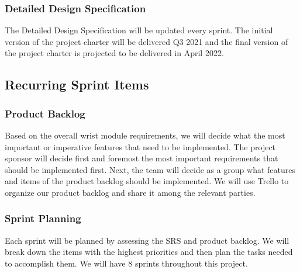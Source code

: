 \subsubsection{Detailed Design Specification}
The Detailed Design Specification will be updated every sprint. The initial version of the project charter will be delivered Q3 2021 and the final version of the project charter is projected to be delivered in April 2022.

\subsection{Recurring Sprint Items}

\subsubsection{Product Backlog}
Based on the overall wrist module requirements, we will decide what the most important or imperative features that need to be implemented. The project sponsor will decide first and foremost the most important requirements that should be implemented first. Next, the team will decide as a group what features and items of the product backlog should be implemented. We will use Trello to organize our product backlog and share it among the relevant parties.
\subsubsection{Sprint Planning}
Each sprint will be planned by assessing the SRS and product backlog. We will break down the items with the highest priorities and then plan the tasks needed to accomplish them. We will have 8 sprints throughout this project. 

